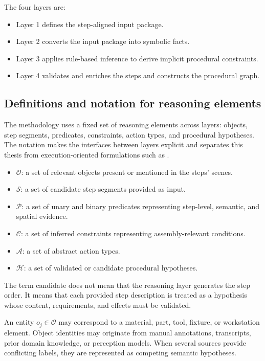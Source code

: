 The four layers are:

\begin{itemize}
    \item Layer 1 defines the step-aligned input package.
    \item Layer 2 converts the input package into symbolic facts.
    \item Layer 3 applies rule-based inference to derive implicit procedural constraints.
    \item Layer 4 validates and enriches the steps and constructs the procedural graph.
\end{itemize}


\subsection{Definitions and notation for reasoning elements}
\label{subsec:method-definition-notation-reasoning}

The methodology uses a fixed set of reasoning elements across layers: objects, step segments, predicates, constraints, action types, and procedural hypotheses. The notation makes the interfaces between layers explicit and separates this thesis from execution-oriented formulations such as \citet{Zhao2025VideoToBT}.

\begin{itemize}
 \item $\mathcal{O}$: a set of relevant objects present or mentioned in the steps' scenes.
 \item $\mathcal{S}$: a set of candidate step segments provided as input.
 \item $\mathcal{P}$: a set of unary and binary predicates representing step-level, semantic, and spatial evidence.
 \item $\mathcal{C}$: a set of inferred constraints representing assembly-relevant conditions.
 \item $\mathcal{A}$: a set of abstract action types.
 \item $\mathcal{H}$: a set of validated or candidate procedural hypotheses.
\end{itemize}


The term candidate does not mean that the reasoning layer generates the step order. It means that each provided step description is treated as a hypothesis whose content, requirements, and effects must be validated.

An entity $o_j \in \mathcal{O}$ may correspond to a material, part, tool, fixture, or workstation element. Object identities may originate from manual annotations, transcripts, prior domain knowledge, or perception models. When several sources provide conflicting labels, they are represented as competing semantic hypotheses.

